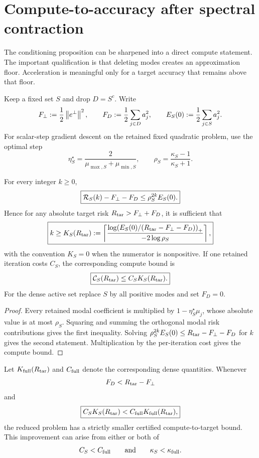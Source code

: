\section{Compute-to-accuracy after spectral contraction}
The conditioning proposition can be sharpened into a direct compute statement. The important qualification is that deleting modes creates an approximation floor. Acceleration is meaningful only for a target accuracy that remains above that floor.

Keep a fixed set $S$ and drop $D=S^c$. Write
\[
F_\perp:=\frac12\left\lVert e^\perp\right\rVert^2,
\qquad
F_D:=\frac12\sum_{j\in D}a_j^2,
\qquad
E_S(0):=\frac12\sum_{j\in S}a_j^2.
\]
For scalar-step gradient descent on the retained fixed quadratic problem, use the optimal step
\[
\eta_S^\star=\frac{2}{\mu_{\max,S}+\mu_{\min,S}},
\qquad
\rho_S=\frac{\kappa_S-1}{\kappa_S+1}.
\]

\begin{theorem}\label{thm:compute-accuracy}
For every integer $k\ge0$,
\[
\boxed{
\mathcal R_S(k)-F_\perp-F_D
\le
\rho_S^{2k}E_S(0).}
\]
Hence for any absolute target risk $R_{\rm tar}>F_\perp+F_D$, it is sufficient that
\[
\boxed{
k\ge
K_S(R_{\rm tar})
:=
\left\lceil
\frac{\log\!\left(E_S(0)/(R_{\rm tar}-F_\perp-F_D)\right)_+}
{-2\log\rho_S}
\right\rceil,}
\]
with the convention $K_S=0$ when the numerator is nonpositive. If one retained iteration costs $C_S$, the corresponding compute bound is
\[
\boxed{\mathcal C_S(R_{\rm tar})\le C_SK_S(R_{\rm tar}).}
\]
For the dense active set replace $S$ by all positive modes and set $F_D=0$.
\end{theorem}

\begin{proof}
Every retained modal coefficient is multiplied by $1-\eta_S^\star\mu_j$, whose absolute value is at most $\rho_S$. Squaring and summing the orthogonal modal risk contributions gives the first inequality. Solving
$\rho_S^{2k}E_S(0)\le R_{\rm tar}-F_\perp-F_D$
for $k$ gives the second statement. Multiplication by the per-iteration cost gives the compute bound.
\end{proof}

\begin{corollary}\label{cor:compute-improve}
Let $K_{\rm full}(R_{\rm tar})$ and $C_{\rm full}$ denote the corresponding dense quantities. Whenever
\[
F_D<R_{\rm tar}-F_\perp
\]
and
\[
\boxed{C_SK_S(R_{\rm tar})<C_{\rm full}K_{\rm full}(R_{\rm tar}),}
\]
the reduced problem has a strictly smaller certified compute-to-target bound. This improvement can arise from either or both of
\[
C_S<C_{\rm full}
\qquad\text{and}\qquad
\kappa_S<\kappa_{\rm full}.
\]
\end{corollary}

